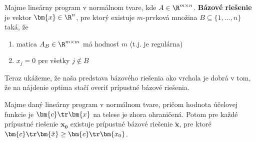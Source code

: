 \begin{framed} 
  \begin{dfn} 
    \label{dfn:LP:basis} 
    Majme lineárny program v normálnom tvare, kde $A\in\R^{m\times n}$.
    {\bfseries Bázové riešenie} je vektor  $\bm{x}\in\R^n$, pre ktorý existuje
    $m$-prvková množina $B\subseteq\{1,\ldots,n\}$ taká, že
    \begin{enumerate}
      \item matica $A_B\in\R^{m\times m}$ má hodnosť $m$ (t.j. je regulárna)
      \item $x_j=0$ pre všetky $j\not\in B$
    \end{enumerate}
  \end{dfn}
\end{framed}

\noindent Teraz ukážeme, že naša predstava bázového riešenia ako vrchola je dobrá
v tom, že na nájdenie optima stačí overiť prípustné bázové riešenia.

\begin{veta}
Majme daný lineárny program v normálnom tvare, pričom hodnota
účelovej funkcie je $\bm{c}\tr\bm{x}$ na telese \dom je zhora ohraničená.
Potom pre každé prípustné riešenie $\bm{x_0}$ existuje prípustné bázové
riešenie $\bm{\tilde{x}}$, pre ktoré
$\bm{c}\tr\bm{\tilde{x}}\ge\bm{c}\tr\bm{x_0}$.
\end{veta}

